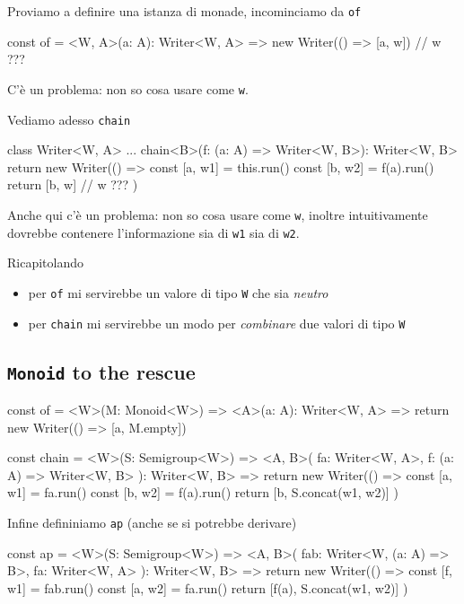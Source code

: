 \documentclass[12pt]{article}
\theoremstyle{definition}
\newenvironment{code}
  {\vspace{0.5cm} \VerbatimEnvironment\begin{typescriptcode}}
  {\end{typescriptcode} \vspace{0.2cm}}
\begin{document}
Proviamo a definire una istanza di monade, incominciamo da \texttt{of}

\begin{code}
const of = <W, A>(a: A): Writer<W, A> =>
  new Writer(() => [a, w]) // w ???
\end{code}

C'è un problema: non so cosa usare come \texttt{w}.

Vediamo adesso \texttt{chain}

\begin{code}
class Writer<W, A> {
  ...
  chain<B>(f: (a: A) => Writer<W, B>): Writer<W, B> {
    return new Writer(() => {
      const [a, w1] = this.run()
      const [b, w2] = f(a).run()
      return [b, w] // w ???
    })
  }
}
\end{code}

Anche qui c'è un problema: non so cosa usare come \texttt{w}, inoltre intuitivamente dovrebbe contenere l'informazione sia di \texttt{w1} sia
di \texttt{w2}.

Ricapitolando

\begin{itemize}
\item per \texttt{of} mi servirebbe un valore di tipo \texttt{W} che sia \emph{neutro}
\item per \texttt{chain} mi servirebbe un modo per \emph{combinare} due valori di tipo \texttt{W}
\end{itemize}

\subsection{\texttt{Monoid} to the rescue}

\begin{code}
const of = <W>(M: Monoid<W>) => <A>(a: A): Writer<W, A> => {
  return new Writer(() => [a, M.empty])
}

const chain = <W>(S: Semigroup<W>) => <A, B>(
  fa: Writer<W, A>,
  f: (a: A) => Writer<W, B>
): Writer<W, B> => {
  return new Writer(() => {
    const [a, w1] = fa.run()
    const [b, w2] = f(a).run()
    return [b, S.concat(w1, w2)]
  })
}
\end{code}

Infine defininiamo \texttt{ap} (anche se si potrebbe derivare)

\begin{code}
const ap = <W>(S: Semigroup<W>) => <A, B>(
  fab: Writer<W, (a: A) => B>,
  fa: Writer<W, A>
): Writer<W, B> => {
  return new Writer(() => {
    const [f, w1] = fab.run()
    const [a, w2] = fa.run()
    return [f(a), S.concat(w1, w2)]
  })
}
\end{code}
\end{document}
